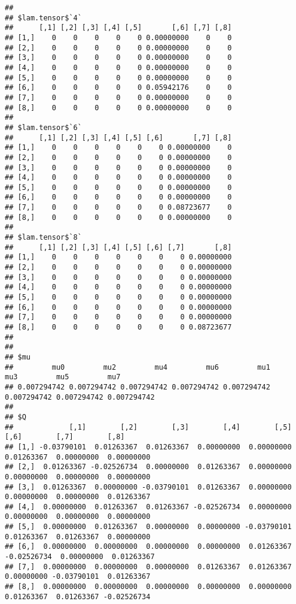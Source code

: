 \documentclass[
]{article}
\begin{document}
\begin{verbatim}
## 
## $lam.tensor$`4`
##      [,1] [,2] [,3] [,4] [,5]       [,6] [,7] [,8]
## [1,]    0    0    0    0    0 0.00000000    0    0
## [2,]    0    0    0    0    0 0.00000000    0    0
## [3,]    0    0    0    0    0 0.00000000    0    0
## [4,]    0    0    0    0    0 0.00000000    0    0
## [5,]    0    0    0    0    0 0.00000000    0    0
## [6,]    0    0    0    0    0 0.05942176    0    0
## [7,]    0    0    0    0    0 0.00000000    0    0
## [8,]    0    0    0    0    0 0.00000000    0    0
## 
## $lam.tensor$`6`
##      [,1] [,2] [,3] [,4] [,5] [,6]       [,7] [,8]
## [1,]    0    0    0    0    0    0 0.00000000    0
## [2,]    0    0    0    0    0    0 0.00000000    0
## [3,]    0    0    0    0    0    0 0.00000000    0
## [4,]    0    0    0    0    0    0 0.00000000    0
## [5,]    0    0    0    0    0    0 0.00000000    0
## [6,]    0    0    0    0    0    0 0.00000000    0
## [7,]    0    0    0    0    0    0 0.08723677    0
## [8,]    0    0    0    0    0    0 0.00000000    0
## 
## $lam.tensor$`8`
##      [,1] [,2] [,3] [,4] [,5] [,6] [,7]       [,8]
## [1,]    0    0    0    0    0    0    0 0.00000000
## [2,]    0    0    0    0    0    0    0 0.00000000
## [3,]    0    0    0    0    0    0    0 0.00000000
## [4,]    0    0    0    0    0    0    0 0.00000000
## [5,]    0    0    0    0    0    0    0 0.00000000
## [6,]    0    0    0    0    0    0    0 0.00000000
## [7,]    0    0    0    0    0    0    0 0.00000000
## [8,]    0    0    0    0    0    0    0 0.08723677
## 
## 
## $mu
##         mu0         mu2         mu4         mu6         mu1         mu3         mu5         mu7 
## 0.007294742 0.007294742 0.007294742 0.007294742 0.007294742 0.007294742 0.007294742 0.007294742 
## 
## $Q
##             [,1]        [,2]        [,3]        [,4]        [,5]        [,6]        [,7]        [,8]
## [1,] -0.03790101  0.01263367  0.01263367  0.00000000  0.00000000  0.01263367  0.00000000  0.00000000
## [2,]  0.01263367 -0.02526734  0.00000000  0.01263367  0.00000000  0.00000000  0.00000000  0.00000000
## [3,]  0.01263367  0.00000000 -0.03790101  0.01263367  0.00000000  0.00000000  0.00000000  0.01263367
## [4,]  0.00000000  0.01263367  0.01263367 -0.02526734  0.00000000  0.00000000  0.00000000  0.00000000
## [5,]  0.00000000  0.01263367  0.00000000  0.00000000 -0.03790101  0.01263367  0.01263367  0.00000000
## [6,]  0.00000000  0.00000000  0.00000000  0.00000000  0.01263367 -0.02526734  0.00000000  0.01263367
## [7,]  0.00000000  0.00000000  0.00000000  0.01263367  0.01263367  0.00000000 -0.03790101  0.01263367
## [8,]  0.00000000  0.00000000  0.00000000  0.00000000  0.00000000  0.01263367  0.01263367 -0.02526734
\end{verbatim}
\end{document}
